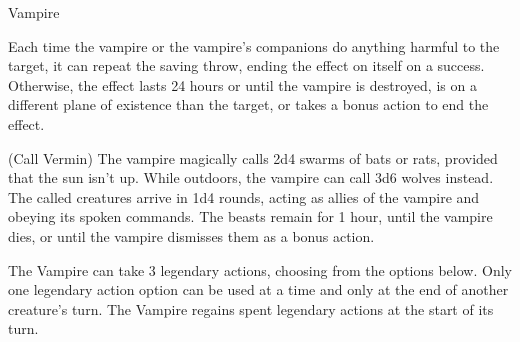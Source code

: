\begin{DndMonster}[float*=hb, width=\textwidth + 8pt]{Vampire}
\begin{multicols}{2}
Each time the vampire or the vampire's companions do anything harmful to the target, it can repeat the saving throw, ending the effect on itself on a success. Otherwise, the effect lasts 24 hours or until the vampire is destroyed, is on a different plane of existence than the target, or takes a bonus action to end the effect.

\DndMonsterAction(Call Vermin)
The vampire magically calls 2d4 swarms of bats or rats, provided that the sun isn't up. While outdoors, the vampire can call 3d6 wolves instead. The called creatures arrive in 1d4 rounds, acting as allies of the vampire and obeying its spoken commands. The beasts remain for 1 hour, until the vampire dies, or until the vampire dismisses them as a bonus action.

The Vampire can take 3 legendary actions, choosing from the options below. Only one legendary action option can be used at a time and only at the end of another creature's turn. The Vampire regains spent legendary actions at the start of its turn.
\begin{DndMonsterLegendaryActions}
\end{DndMonsterLegendaryActions}
\end{multicols}
\end{DndMonster}

